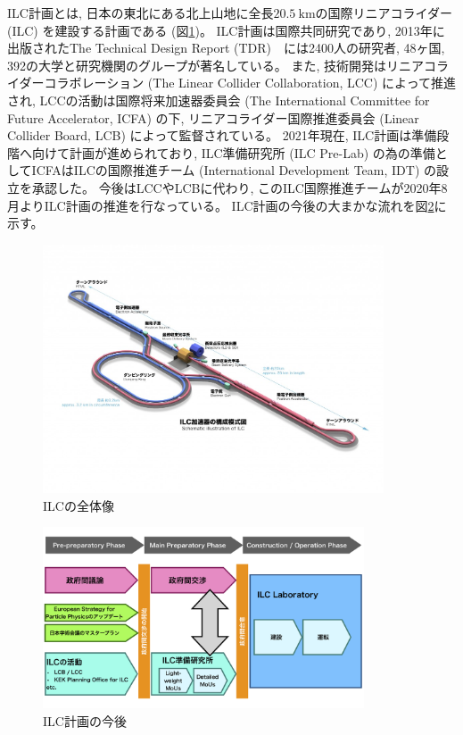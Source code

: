 ILC計画とは, 日本の東北にある北上山地に全長$20.5\ \mathrm{km}$の国際リニアコライダー (ILC) を建設する計画である (図\ref{2InternationalLinearCollider})。
ILC計画は国際共同研究であり, 2013年に出版されたThe Technical Design Report (TDR\cite{ILCTDRVES})　には2400人の研究者, 48ヶ国, 392の大学と研究機関のグループが著名している。
また, 技術開発はリニアコライダーコラボレーション (The Linear Collider Collaboration, LCC) によって推進され, LCCの活動は国際将来加速器委員会 (The International Committee for Future Accelerator, ICFA) の下, リニアコライダー国際推進委員会 (Linear Collider Board, LCB) によって監督されている。
2021年現在, ILC計画は準備段階へ向けて計画が進められており, ILC準備研究所 (ILC Pre-Lab) の為の準備としてICFAはILCの国際推進チーム (International Development Team, IDT) の設立を承認した。
今後はLCCやLCBに代わり, このILC国際推進チームが2020年8月よりILC計画の推進を行なっている。
ILC計画の今後の大まかな流れを図\ref{3ILCProject}に示す。

\begin{figure}[htbp]
 \centering
  \includegraphics[trim = 0 100 0 100, width=0.9\textwidth, clip]{Figure/1Introduction/2InternationalLinearCollider.jpg}
  \caption[ILCの全体像]
                 {ILCの全体像\cite{ILCPHOTO}}
  \label{2InternationalLinearCollider}
\end{figure}

\begin{figure}[htbp]
 \centering
 \includegraphics[width=0.85\textwidth]{Figure/1Introduction/3ILCProject.png}
 \caption[ILC計画の今後]
                {ILC計画の今後\cite{RecommendationsonILCProjectImplementation}}
 \label{3ILCProject}
\end{figure}


